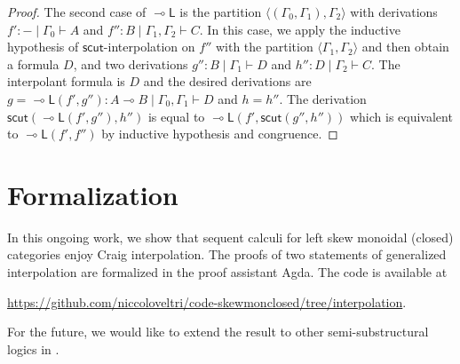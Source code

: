 \documentclass[sn-mathphys-num]{sn-jnl}%
\newcommand{\GG}{\Gamma}
\newcommand{\vd}{\vdash}
\newcommand{\lolli}{\multimap}
\newcommand{\lleft}{{\lolli}\mathsf{L}}
\newcommand{\mf}[1]{\mathsf{#1}}
\newcommand{\scut}[2]{\mf{scut} (#1 , #2)}
\theoremstyle{thmstyleone}%
\theoremstyle{thmstyletwo}%
\theoremstyle{thmstylethree}%
\begin{document}
\begin{proof}
The second case of $\lleft$ is the partition $\langle (\GG_0 , \GG_1) , \GG_2 \rangle$ with derivations $f' : {-} \mid \GG_0 \vd A$ and $f'' : B \mid \GG_1 , \GG_2 \vd C$.
In this case, we apply the inductive hypothesis of $\mf{scut}$-interpolation on $f''$ with the partition $\langle \GG_1 , \GG_2 \rangle$ and then obtain a formula $D$, and two derivations $g'' : B \mid \GG_1 \vd D$ and $h'' : D \mid \GG_2 \vd C$.
The interpolant formula is $D$ and the desired derivations are $g = \lleft (f' , g'') : A \lolli B \mid \GG_0 , \GG_1 \vd D$ and $h = h''$.
The derivation $\scut{\lleft (f' , g'')}{h''}$ is equal to $\lleft (f' , \scut{g''}{h''})$ which is equivalent to $\lleft (f' , f'')$ by inductive hypothesis and congruence.
\end{proof}
\section{Formalization}
In this ongoing work, we show that sequent calculi for left skew monoidal (closed) categories enjoy Craig interpolation.
The proofs of two statements of generalized interpolation are formalized in the proof assistant Agda.
The code is available at
\begin{center}
  \url{https://github.com/niccoloveltri/code-skewmonclosed/tree/interpolation}.
\end{center}
For the future, we would like to extend the result to other semi-substructural logics in \cite{veltri:coherence:2021,VW:2023}.






\end{document}
